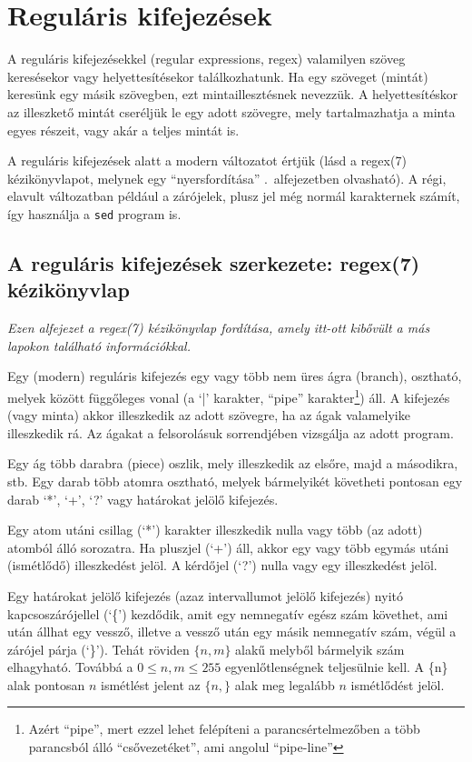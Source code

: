 \chapter{Reguláris kifejezések}%
\label{cha:regex}

A reguláris kifejezésekkel (regular expressions, regex)
valamilyen szöveg keresésekor vagy helyettesítésekor
találkozhatunk. Ha egy szöveget (mintát) keresünk egy másik szövegben, ezt
mintaillesztésnek nevezzük. A helyettesítéskor az illeszkető mintát cseréljük le
egy adott szövegre, mely tartalmazhatja a minta egyes részeit, vagy akár a
teljes mintát is.

A reguláris kifejezések alatt a modern változatot értjük (lásd a regex(7)
kézikönyvlapot, melynek egy ``nyersfordítása''
.\ alfejezetben olvasható). A régi, elavult
változatban például a zárójelek, plusz jel még normál karakternek számít, így
használja a \texttt{sed} program is.


\section{A reguláris kifejezések szerkezete: regex(7) kézikönyvlap}
\label{sec:regex-man7}

\emph{Ezen alfejezet a \emph{regex(7)} kézikönyvlap fordítása, amely itt-ott
 kibővült a más lapokon található információkkal.}

Egy (modern) reguláris kifejezés egy vagy több nem üres ágra (branch),
osztható, melyek között függőleges vonal (a `|' karakter, ``pipe''
karakter\footnote{Azért ``pipe'', mert ezzel lehet felépíteni a
parancsértelmezőben a több parancsból álló ``csővezetéket'', ami angolul
``pipe-line''}) áll. A kifejezés (vagy minta) akkor illeszkedik az adott
szövegre, ha az ágak valamelyike illeszkedik rá. Az ágakat a felsorolásuk
sorrendjében vizsgálja az adott program.

Egy ág több darabra (piece) oszlik, mely illeszkedik az elsőre, majd a
másodikra, stb. Egy darab több atomra osztható, melyek bármelyikét követheti
pontosan egy darab `*', `+', `?' vagy határokat jelölő kifejezés.

Egy atom utáni csillag (`*') karakter illeszkedik nulla vagy több (az adott)
atomból álló sorozatra. Ha pluszjel (`+') áll, akkor egy vagy több egymás utáni
(ismétlődő) illeszkedést jelöl. A kérdőjel (`?') nulla vagy egy illeszkedést
jelöl.

Egy határokat jelölő kifejezés (azaz intervallumot jelölő kifejezés) nyitó
kapcsoszárójellel (`\{') kezdődik, amit egy nemnegatív egész szám követhet, ami
után állhat egy vessző, illetve a vessző után egy másik nemnegatív szám, végül a
zárójel párja (`\}'). Tehát röviden $\{n,m\}$ alakű melyből bármelyik szám
elhagyható. Továbbá a $0 \le n, m \le 255$ egyenlőtlenségnek teljesülnie kell. A
\{n\} alak pontosan $n$ ismétlést jelent az $\{n,\}$ alak meg legalább $n$
ismétlődést jelöl.

